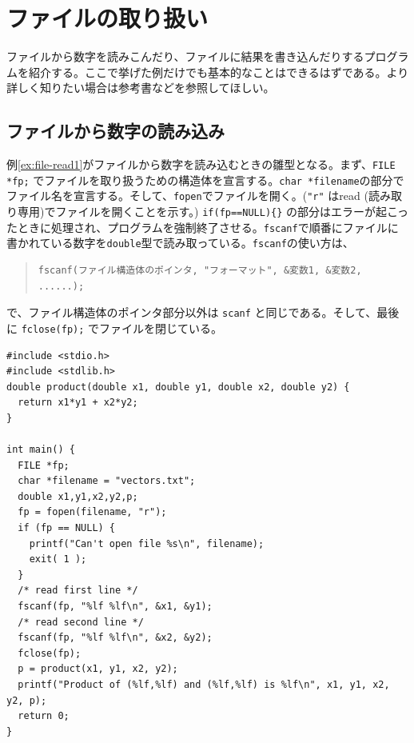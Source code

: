 \section{ファイルの取り扱い}
ファイルから数字を読みこんだり、ファイルに結果を書き込んだりするプログラムを紹介する。ここで挙げた例だけでも基本的なことはできるはずである。より詳しく知りたい場合は参考書などを参照してほしい。

\subsection{ファイルから数字の読み込み}
例\ref{ex:file-read1}がファイルから数字を読み込むときの雛型となる。まず、\verb|FILE *fp;| でファイルを取り扱うための構造体を宣言する。\verb|char *filename|の部分でファイル名を宣言する。そして、\verb|fopen|でファイルを開く。(\verb|"r"| はread (読み取り専用)でファイルを開くことを示す。) \verb|if(fp==NULL){}| の部分はエラーが起こったときに処理され、プログラムを強制終了させる。\verb|fscanf|で順番にファイルに書かれている数字を\verb|double|型で読み取っている。\verb|fscanf|の使い方は、
%
\begin{quote}
\begin{verbatim}
fscanf(ファイル構造体のポインタ, "フォーマット", &変数1, &変数2, ......);
\end{verbatim}
\end{quote}
%
で、ファイル構造体のポインタ部分以外は \verb|scanf| と同じである。そして、最後に \verb|fclose(fp);| でファイルを閉じている。
%
\begin{reidai}\label{ex:file-read1}
\begin{verbatim}
#include <stdio.h>
#include <stdlib.h>
double product(double x1, double y1, double x2, double y2) {
  return x1*y1 + x2*y2;
}

int main() {
  FILE *fp;
  char *filename = "vectors.txt";
  double x1,y1,x2,y2,p;
  fp = fopen(filename, "r");
  if (fp == NULL) {
    printf("Can't open file %s\n", filename);
    exit( 1 );
  }
  /* read first line */
  fscanf(fp, "%lf %lf\n", &x1, &y1);
  /* read second line */
  fscanf(fp, "%lf %lf\n", &x2, &y2);
  fclose(fp);
  p = product(x1, y1, x2, y2);
  printf("Product of (%lf,%lf) and (%lf,%lf) is %lf\n", x1, y1, x2, y2, p);
  return 0;
}
\end{verbatim}
\end{reidai} \noindent
